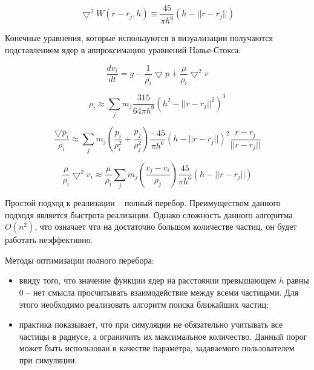 \begin{equation}
\label{eq:}
\bigtriangledown^2W(r - r_j, h) \equiv \frac{45}{\pi{}h^6}(h - ||r - r_j||)
\end{equation}

Конечные уравнения, которые используются в визуализации получаются подставлением ядер
в аппроксимацию уравнений Навье-Стокса:

\begin{equation}
\label{eq:}
\frac{dv_i}{dt} = g - \frac{1}{\rho_i}\bigtriangledown{}p + \frac{\mu}{\rho_i}\bigtriangledown^2v
\end{equation}

\begin{equation}
\label{eq:}
\rho_i \approx \sum_{j}m_j\frac{315}{64\pi{}h^9} (h^2 - ||r - r_j||^2)^3
\end{equation}

\begin{equation}
\label{eq:}
\frac{\bigtriangledown{}p_i}{\rho_i} \approx \sum_{j}m_j(\frac{p_i}{\rho_i^2} + \frac{p_j}{\rho_j^2}) \frac{-45}{\pi{}h^6}(h - ||r-r_j||)^2\frac{r - r_j}{||r - r_j||}
\end{equation}

\begin{equation}
\label{eq:}
\frac{\mu}{\rho_i}\bigtriangledown^2v_i \approx \frac{\mu}{\rho_i} \sum_{j}m_j(\frac{v_j - v_i}{\rho_j})\frac{45}{\pi{}h^6}(h - ||r - r_j||)
\end{equation}

Простой подход к реализации -- полный перебор. Преимуществом данного подходя является быстрота
реализации. Однако сложность данного алгоритма $O(n^2)$, что означает что на достаточно большом
количестве частиц, он будет работать неэффективно.

Методы оптимизации полного перебора:

\begin{itemize}
  \item ввиду того, что значение функции ядер на расстоянии превышающем $h$ равны 0 -- нет смысла
    просчитывать взаимодействие между всеми частицами. Для этого необходимо реализовать
    алгоритм поиска ближайших частиц;
  \item практика показывает, что при симуляции не обязательно учитывать все частицы в радиусе, а
    ограничить их максимальное количество. Данный порог может быть использован в качестве
    параметра, задаваемого пользователем при симуляции.
\end{itemize}

